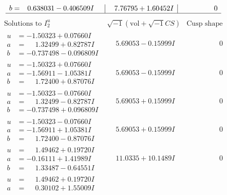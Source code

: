 \documentclass[1p]{elsarticle_modified}
\theoremstyle{definition}
\newcommand{\I}{\sqrt{-1}}
\begin{document}
$$\begin{array}{c|c|c}
\begin{aligned}
b &= \phantom{-}0.638031 - 0.406509 I\end{aligned}
 & \phantom{-}7.76795 + 1.60452 I & \phantom{-0.000000 } 0\\
 \hline 
 \end{array}$$\newpage$$\begin{array}{c|c|c}  
\text{Solutions to }I^u_{2}& \I (\text{vol} + \sqrt{-1}CS) & \text{Cusp shape}\\
 \hline 
\begin{aligned}
u &= -1.50323 + 0.07660 I \\
a &= \phantom{-}1.32499 + 0.82787 I \\
b &= -0.737498 - 0.096809 I\end{aligned}
 & \phantom{-}5.69053 - 0.15999 I & \phantom{-0.000000 } 0 \\ \hline\begin{aligned}
u &= -1.50323 + 0.07660 I \\
a &= -1.56911 - 1.05381 I \\
b &= \phantom{-}1.72400 + 0.87076 I\end{aligned}
 & \phantom{-}5.69053 - 0.15999 I & \phantom{-0.000000 } 0 \\ \hline\begin{aligned}
u &= -1.50323 - 0.07660 I \\
a &= \phantom{-}1.32499 - 0.82787 I \\
b &= -0.737498 + 0.096809 I\end{aligned}
 & \phantom{-}5.69053 + 0.15999 I & \phantom{-0.000000 } 0 \\ \hline\begin{aligned}
u &= -1.50323 - 0.07660 I \\
a &= -1.56911 + 1.05381 I \\
b &= \phantom{-}1.72400 - 0.87076 I\end{aligned}
 & \phantom{-}5.69053 + 0.15999 I & \phantom{-0.000000 } 0 \\ \hline\begin{aligned}
u &= \phantom{-}1.49462 + 0.19720 I \\
a &= -0.16111 + 1.41989 I \\
b &= \phantom{-}1.33487 - 0.64551 I\end{aligned}
 & \phantom{-}11.0335 + 10.1489 I & \phantom{-0.000000 } 0 \\ \hline\begin{aligned}
u &= \phantom{-}1.49462 + 0.19720 I \\
a &= \phantom{-}0.30102 + 1.55009 I \\

\end{aligned}
\end{array}$$
\end{document}
